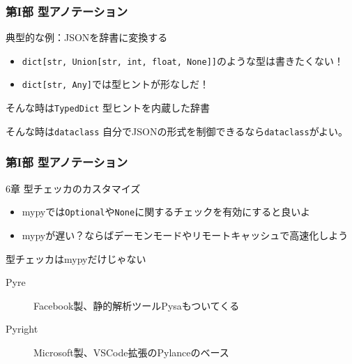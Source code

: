 \documentclass[aspectratio=169,dvipdfmx,14pt,notheorems]{beamer}
\theoremstyle{definition}
\begin{document}
\begin{frame}\frametitle{第I部 型アノテーション}

\begin{exampleblock}{典型的な例：JSONを辞書に変換する}
\begin{itemize}
\item \texttt{dict[str, Union[str, int, float, None]]}のような型は書きたくない！
\item \texttt{dict[str, Any]}では型ヒントが形なしだ！
\end{itemize}

\end{exampleblock}

\begin{block}{そんな時は\texttt{TypedDict}}
型ヒントを内蔵した辞書
\end{block}

\begin{block}{そんな時は\texttt{dataclass}}
自分でJSONの形式を制御できるなら\texttt{dataclass}がよい。
\end{block}

\end{frame}

\begin{frame}\frametitle{第I部 型アノテーション}

\begin{block}{6章 型チェッカのカスタマイズ}
\begin{itemize}
\item mypyでは\texttt{Optional}や\texttt{None}に関するチェックを有効にすると良いよ
\item mypyが遅い？ならばデーモンモードやリモートキャッシュで高速化しよう
\end{itemize}
\end{block}

\begin{exampleblock}{型チェッカはmypyだけじゃない}
\begin{description}
\item[Pyre] Facebook製、静的解析ツールPysaもついてくる
\item[Pyright] Microsoft製、VSCode拡張のPylanceのベース
\end{description}
\end{exampleblock}

\end{frame}
\end{document}
